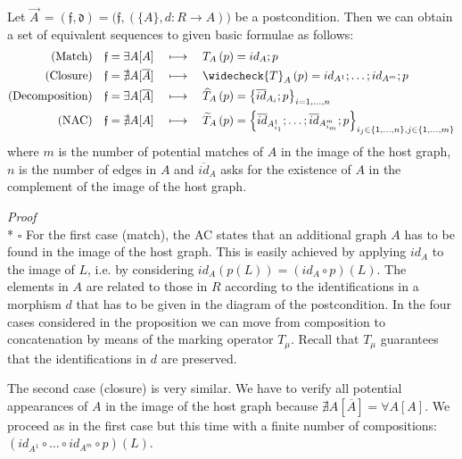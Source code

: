 \documentclass{fundam}
\begin{document}
\begin{proposition}
  \label{prop:postConds}
  Let $\stackrel{\rightarrow}{A} \, = \left( \mathfrak{f},
    \mathfrak{d} \right) = \big( \mathfrak{f}, \left(\{A\}, d:R
    \rightarrow A \right)\!\big)$ be a postcondition. Then we can
  obtain a set of equivalent sequences to given basic formulae as
  follows:
  \begin{align}
    \label{eq:postMatch}
    \textrm{(Match)} \quad \mathfrak{f} &= \exists A [A] \quad
    \longmapsto \quad T_A\left(p\right) = id_A ; p \\
    \label{eq:closure}
    \textrm{(Closure)} \quad
    \mathfrak{f} &= \nexists A [\overline{A}] \quad
    \longmapsto \quad \widecheck{T}_A\left(p\right) = id_{A^1} ;
    \ldots ; id_{A^m}; p \\
    \label{eq:decomp}
    \textrm{(Decomposition)} \quad 
    \mathfrak{f} &= \exists A [\overline{A}] \quad \longmapsto
    \quad \widehat{T}_A\left(p\right) = \left\{ \overline{id}_{A_i} ;
      p \right\}_{i = 1, \ldots, n} \\
    \label{eq:postNAC} \textrm{(NAC)} \quad \mathfrak{f}
    &= \nexists A [A] \quad \longmapsto \quad 
    \widetilde{T}_A \left( p \right) = \left\{
      \overline{id}_{A^1_{i_1}} ; \ldots ;
      \overline{id}_{A^m_{i_m}}; p \right\}_{i_j \in \{1, \ldots, n\},
    j \in \{1, \ldots, m\}}
  \end{align}
  where $m$ is the number of potential matches of $A$ in the image of
  the host graph, $n$ is the number of edges in $A$ and
  $\overline{id}_A$ asks for the existence of $A$ in the complement of
  the image of the host graph.
\end{proposition}

\noindent \emph{Proof} \\*
$\square$ For the first case (match), the AC states that an additional
graph $A$ has to be found in the image of the host graph. This is
easily achieved by applying $id_A$ to the image of $L$, i.e. by
considering $id_A \left( p(L) \right) = \left( id_A \circ p \right)
(L)$. The elements in $A$ are related to those in $R$ according to the
identifications in a morphism $d$ that has to be given in the diagram
of the postcondition. In the four cases considered in the proposition
we can move from composition to concatenation by means of the marking
operator $T_\mu$. Recall that $T_\mu$ guarantees that the
identifications in $d$ are preserved.

The second case (closure) is very similar. We have to verify all
potential appearances of $A$ in the image of the host graph because
$\nexists A [\overline{A}] = \forall A [A]$. We proceed as in the
first case but this time with a finite number of compositions: $\left(
  id_{A^1} \circ \ldots \circ id_{A^m} \circ p \right) (L)$.
\end{document}
